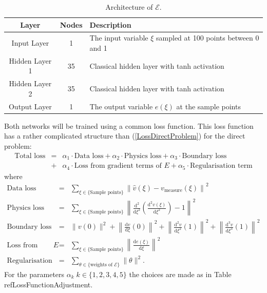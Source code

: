 \documentclass[a4paper,11pt]{article}
\begin{document}
\begin{table}[h!]
\centering
\begin{tabular}{ccl}
\toprule
\textbf{Layer} & \textbf{Nodes} & \textbf{Description}\\
\midrule
Input Layer & 1 & The input variable $\xi $ sampled at 100 points between 0 and 1\\
Hidden Layer 1 & 35 & Classical hidden layer with tanh activation\\
Hidden Layer  2& 35 & Classical hidden layer with tanh activation\\
Output Layer & 1 & The output variable $e(\xi ) $ at the sample points\\
\bottomrule
\end{tabular}
\caption{Architecture of $\mathscr{E}$.}
\end{table}
Both networks will be trained using a common loss function. This loss function has a rather complicated structure than (\ref{LossDirectProblem}) for the direct problem:
\begin{eqnarray*}
\text{Total loss} & = &  \alpha_1 \cdot \text{Data loss} + \alpha_2 \cdot \text{Physics loss} + \alpha_3 \cdot\text{Boundary loss} \\
& + &  \alpha_4 \cdot \text{Loss from gradient terms of } E +\alpha_5 \cdot\text{Regularisation term}
\end{eqnarray*}
where
\begin{eqnarray*}
\text{Data loss} & = & \sum_{\xi \in \{\text{Sample points}\}} \left\| \hat{v}(\xi) - v_{\operatorname{measure}} (\xi ) \right\|^2 \\
\text{Physics loss} & = & \sum_{\xi \in \{\text{Sample points}\}} \left\|  \tfrac{\mathrm{d}^2}{\mathrm{d}\xi^2} \left(  \tfrac{\mathrm{d}^2 v(\xi)}{\mathrm{d}\xi^2} \right)-1  \right\|^2 \\
\text{Boundary loss}  & = & \| v (0) \|^2 + \left\|\tfrac{\mathrm{d} v}{\mathrm{d}\xi}(0) \right\|^2 + \left\|\tfrac{\mathrm{d}^2 v}{\mathrm{d}\xi^2} (1) \right\|^2 + \left\|\tfrac{\mathrm{d}^3 v}{\mathrm{d}\xi^3}(1) \right\|^2 \\
\text{Loss from gradient terms of } E  & = & \sum_{\xi \in \{\text{Sample points}\}} \left\|  \tfrac{\mathrm{d} e ( \xi ) }{\mathrm{d}\xi} \right\|^2 \\
\text{Regularisation term} & = & \sum_{\theta \in \{\text{weights of }\mathscr{E}\}} \| \theta \|^2 .
\end{eqnarray*}
For the parameters $ \alpha_k \; k\in\{1,2,3,4,5\} $ the choices are made as in Table ref{LossFunctionAdjustment}.
\end{document}
